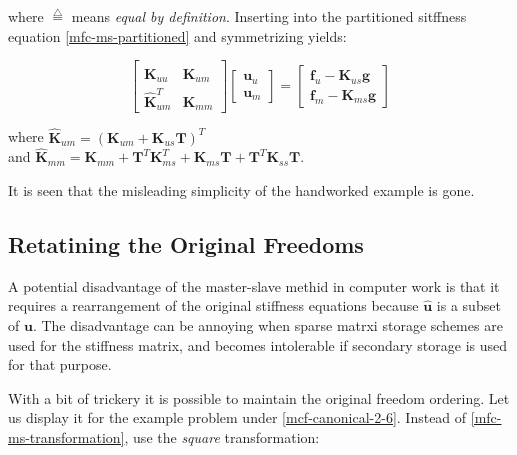 \documentclass[10pt,b5paper,titlepage]{book}
\newcommand*\eqd{\stackrel{\triangle}{=}}
\begin{document}
where $ \eqd $ means \textit{equal by definition}. Inserting into the partitioned
sitffness equation \eqref{mfc-ms-partitioned} and symmetrizing yields:

\begin{equation}
    \begin{bmatrix}
        \mathbf{K}_{uu} & \mathbf{\hat{K}}_{um} \\
        \mathbf{\hat{K}}_{um}^T &
        \mathbf{\hat{K}}_{mm}
    \end{bmatrix}
    \begin{bmatrix}
        \mathbf{u}_u \\
        \mathbf{u}_m
    \end{bmatrix}
    = \begin{bmatrix}
        \mathbf{f}_u - \mathbf{K}_{us} \mathbf{g} \\
        \mathbf{f}_m - \mathbf{K}_{ms} \mathbf{g}
    \end{bmatrix}
\end{equation}

where $ \mathbf{\hat{K}}_{um} = \left( \mathbf{K}_{um} + \mathbf{K}_{us} \mathbf{T} \right)^T $ \\
and $ \mathbf{\hat{K}}_{mm} = \mathbf{K}_{mm} + \mathbf{T}^T \mathbf{K}_{ms}^T
+ \mathbf{K}_{ms} \mathbf{T} + \mathbf{T}^T \mathbf{K}_{ss} \mathbf{T} $.

It is seen that the misleading simplicity of the handworked example is gone.


\subsection{Retatining the Original Freedoms}

A potential disadvantage of the master-slave methid in computer work is that it
requires a rearrangement of the original stiffness equations because
$ \mathbf{\hat{u}} $ is a subset of $ \mathbf{u} $. The disadvantage can be
annoying when sparse matrxi storage schemes are used for the stiffness matrix,
and becomes intolerable if secondary storage is used for that purpose.

With a bit of trickery it is possible to maintain the original freedom ordering.
Let us display it for the example problem under \eqref{mcf-canonical-2-6}.
Instead of \eqref{mfc-ms-transformation}, use the \textit{square} transformation:
\end{document}
